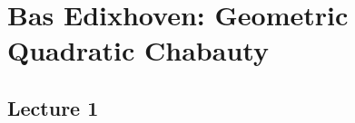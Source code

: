 \newpage
\section{Bas Edixhoven: Geometric Quadratic Chabauty}
\subsection{Lecture 1}




































 